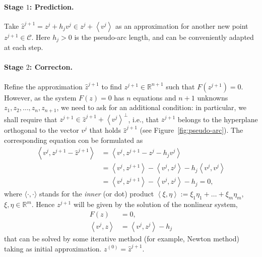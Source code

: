 \documentclass[11pt,reqno,twoside]{article}
\newcommand{\R}{\ensuremath{\mathbb{R}}}
\theoremstyle{remark}
\begin{document}
  \paragraph{Stage $1$: Prediction.}
    Take $\hat{z}^{j+1} = z^{j} + h_{j}
    v^{j}\in z^{j} + \left\langle v^{j}\right\rangle$ as an approximation
    for another new point $z^{j+1}\in\mathcal{C}$. Here $h_{j} > 0$ is the
    pseudo-arc length, and can be conveniently adapted at each step. 
  \paragraph{Stage $2$: Correcton.}
 Refine the approximation $\hat{z}^{j+1}$ to
    find $z^{j+1}\in\R^{n+1}$ such that $F\left(z^{j+1}\right) = 0$.
    However, as the system $F(z) = 0$ has $n$ equations and $n+1$ unknowns
    $z_{1}, z_{2},\dots,z_{n},z_{n+1}$, we need to ask for an additional
    condition: in particular, we shall require that 
    $z^{j+1}\in\hat{z}^{j+1} +\left\langle v^{j}\right\rangle^{\perp}$, i.e., that
    $z^{j+1}$ belongs to
    the hyperplane orthogonal to the vector $v^{j}$ that holds
    $\hat{z}^{j+1}$
    (see Figure~\ref{fig:pseudo-arc}). The  
    corresponding equation con be formulated as
    \begin{align*}
      \left\langle v^{j}, z^{j+1} - \hat{z}^{j+1}\right\rangle &=  
      \left\langle v^{j}, z^{j+1} - z^{j} - h_{j} v^{j}\right\rangle \\
      &= \left\langle v^{j}, z^{j+1}\right\rangle -
        \left\langle v^{j}, z^{j}\right\rangle - 
        h_{j} \left\langle v^{j}, v^{j}\right\rangle\\
      &=  \left\langle v^{j}, z^{j+1}\right\rangle -
          \left\langle v^{j}, z^{j}\right\rangle - h_{j} = 0,
    \end{align*}
    where $\langle\cdot, \cdot\rangle$ stands for the \emph{inner} (or dot)
    product $\left\langle\xi, \eta\right\rangle := \xi_{1}\eta_{1} + \dots +
    \xi_{m}\eta_{m}$, $\xi, \eta\in\R^{m}$. Hence $z^{j+1}$ will be
    given by the solution of the nonlinear system,
    \begin{displaymath}
      \begin{split}%
        F(z) &= 0,\\
        \left\langle v^{j}, z\right\rangle &= \left\langle v^{j},
        z^{j}\right\rangle - h_{j}
        \end{split}
    \end{displaymath}
    that can be solved by some iterative method (for example, Newton
    method) taking as initial approximation. $z^{(0)} = \hat{z}^{j+1}$. 
\end{document}
